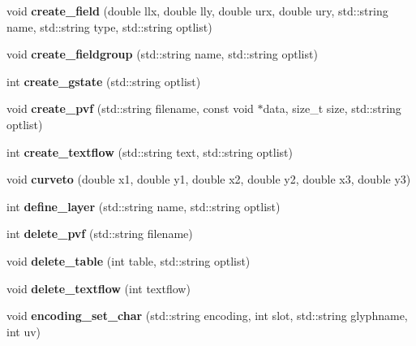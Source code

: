 \begin{DoxyCompactItemize}
\hypertarget{classPDFlib_adf5520b414e9426b73d375cfbb142a20}{}\label{classPDFlib_adf5520b414e9426b73d375cfbb142a20} 
void {\bfseries create\+\_\+field} (double llx, double lly, double urx, double ury, std\+::string name, std\+::string type, std\+::string optlist)
\item 
\hypertarget{classPDFlib_a44fb65e6533101477d39fde1730c92e6}{}\label{classPDFlib_a44fb65e6533101477d39fde1730c92e6} 
void {\bfseries create\+\_\+fieldgroup} (std\+::string name, std\+::string optlist)
\item 
\hypertarget{classPDFlib_ae2eabf14be762f2999aedd15a1626234}{}\label{classPDFlib_ae2eabf14be762f2999aedd15a1626234} 
int {\bfseries create\+\_\+gstate} (std\+::string optlist)
\item 
\hypertarget{classPDFlib_a208ad8e80e2733820d54e6fb4f6313b8}{}\label{classPDFlib_a208ad8e80e2733820d54e6fb4f6313b8} 
void {\bfseries create\+\_\+pvf} (std\+::string filename, const void $\ast$data, size\+\_\+t size, std\+::string optlist)
\item 
\hypertarget{classPDFlib_a9b80d68d417defcc9547b007c61b8877}{}\label{classPDFlib_a9b80d68d417defcc9547b007c61b8877} 
int {\bfseries create\+\_\+textflow} (std\+::string text, std\+::string optlist)
\item 
\hypertarget{classPDFlib_ae331bf087034fdc7961fbc95db5479a6}{}\label{classPDFlib_ae331bf087034fdc7961fbc95db5479a6} 
void {\bfseries curveto} (double x1, double y1, double x2, double y2, double x3, double y3)
\item 
\hypertarget{classPDFlib_a9ee76ee9081c4ef79c378ad4ed62df58}{}\label{classPDFlib_a9ee76ee9081c4ef79c378ad4ed62df58} 
int {\bfseries define\+\_\+layer} (std\+::string name, std\+::string optlist)
\item 
\hypertarget{classPDFlib_a60c311c1176f37551fade62b15e260fa}{}\label{classPDFlib_a60c311c1176f37551fade62b15e260fa} 
int {\bfseries delete\+\_\+pvf} (std\+::string filename)
\item 
\hypertarget{classPDFlib_a87643d5d18be98c83ae636b6e3013e8f}{}\label{classPDFlib_a87643d5d18be98c83ae636b6e3013e8f} 
void {\bfseries delete\+\_\+table} (int table, std\+::string optlist)
\item 
\hypertarget{classPDFlib_ac4562f4944113165c37d27c3f2481412}{}\label{classPDFlib_ac4562f4944113165c37d27c3f2481412} 
void {\bfseries delete\+\_\+textflow} (int textflow)
\item 
\hypertarget{classPDFlib_a83ebfdf9ada3df0634b6748aa2d27eff}{}\label{classPDFlib_a83ebfdf9ada3df0634b6748aa2d27eff} 
void {\bfseries encoding\+\_\+set\+\_\+char} (std\+::string encoding, int slot, std\+::string glyphname, int uv)

\end{DoxyCompactItemize}
